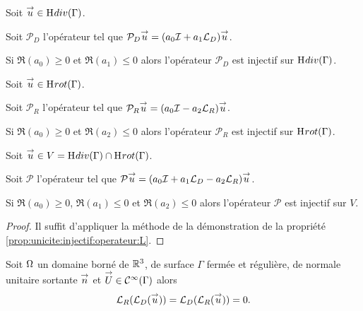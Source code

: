   \begin{prop}
    \label{prop:unicite:injectif:operateur:LD}
    Soit \(\vu \in \Sobolev[div]{(\Gamma)}\).

    Soit \(\mathcal{P}_D\) l'opérateur tel que \(\mathcal{P}_D\vu = (a_0\oI + a_1 \LD)\vu\).

    Si \(\Re(a_0)\ge 0\) et \(\Re(a_1)\le 0\) alors l'opérateur \(\mathcal{P}_D\) est injectif sur \(\Sobolev[div]{(\Gamma)}\).
  \end{prop}
  \begin{prop}
    \label{prop:unicite:injectif:operateur:LR}
    Soit \(\vu \in \Sobolev[rot]{(\Gamma)}\).

    Soit \(\mathcal{P}_R\) l'opérateur tel que \(\mathcal{P}_R\vu = (a_0\oI - a_2 \LR)\vu\).

    Si \(\Re(a_0)\ge 0\) et \(\Re(a_2)\le 0\) alors l'opérateur \(\mathcal{P}_R\) est injectif sur \(\Sobolev[rot]{(\Gamma)}\).
  \end{prop}
  \begin{prop}
    \label{prop:unicite:injectif:operateur:LD-LR}
    Soit \(\vu \in V=\Sobolev[div]{(\Gamma)}\cap \Sobolev[rot]{(\Gamma)}\).
    
    Soit \(\mathcal{P}\) l'opérateur tel que \(\mathcal{P}\vu = (a_0\oI + a_1 \LD - a_2\LR)\vu\).

    Si \(\Re(a_0)\ge 0\), \(\Re(a_1)\le 0\) et \(\Re(a_2)\le 0\) alors l'opérateur \(\mathcal{P}\) est injectif sur \(V\).
  \end{prop}
  \begin{proof}
    Il suffit d'appliquer la méthode de la démonstration de la propriété \ref{prop:unicite:injectif:operateur:L}.
  \end{proof}

  \begin{prop}
    Soit \(\OO\) un domaine borné de \(\RR^3\), de surface \(\Gamma\) fermée et régulière, de normale unitaire sortante \(\vect n\) et \(\vect{U} \in \mathcal{C}^{\infty}(\Gamma)\) alors
    \begin{equation*}
        \LR(\LD(\vu)) = \LD(\LR(\vu)) = 0.
    \end{equation*}
  \end{prop}

